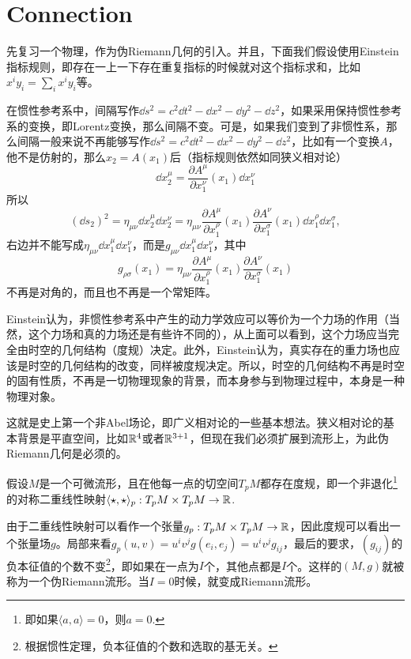 \chapter{Connection}
\newcommand{\gl}{\mathfrak{gl}}

先复习一个物理，作为伪Riemann几何的引入。并且，下面我们假设使用Einstein指标规则，即存在一上一下存在重复指标的时候就对这个指标求和，比如$x^iy_i=\sum_{i}x^iy_i$等。

在惯性参考系中，间隔写作$\dd s^2=c^2 \dd t^2-\dd x^2-\dd y^2-\dd z^2$，如果采用保持惯性参考系的变换，即Lorentz变换，那么间隔不变。可是，如果我们变到了非惯性系，那么间隔一般来说不再能够写作$\dd s^2=c^2 \dd t^2-\dd x^2-\dd y^2-\dd z^2$，比如有一个变换$A$，他不是仿射的，那么$x_2=A(x_1)$后（指标规则依然如同狭义相对论）
\[
	\dd x_2^\mu=\frac{\partial A^\mu}{\partial x_1^\nu}(x_1)\dd x_1^\nu
\]
所以
\[
	(\dd s_2)^2=\eta_{\mu\nu}\dd x_2^\mu\dd x_2^\nu=\eta_{\mu\nu}\frac{\partial A^\mu}{\partial x_1^\rho}(x_1)\frac{\partial A^\nu}{\partial x_1^\sigma}(x_1)\dd x_1^\rho\dd x_1^\sigma,
\]
右边并不能写成$\eta_{\mu\nu}\dd x_1^\mu\dd x_1^\nu$，而是$g_{\mu\nu}\dd x_1^\mu\dd x_1^\nu$，其中
\[
	g_{\rho\sigma}(x_1)=\eta_{\mu\nu}\frac{\partial A^\mu}{\partial x_1^\rho}(x_1)\frac{\partial A^\nu}{\partial x_1^\sigma}(x_1)
\]
不再是对角的，而且也不再是一个常矩阵。

Einstein认为，非惯性参考系中产生的动力学效应可以等价为一个力场的作用（当然，这个力场和真的力场还是有些许不同的），从上面可以看到，这个力场应当完全由时空的几何结构（度规）决定。此外，Einstein认为，真实存在的重力场也应该是时空的几何结构的改变，同样被度规决定。所以，时空的几何结构不再是时空的固有性质，不再是一切物理现象的背景，而本身参与到物理过程中，本身是一种物理对象。

这就是史上第一个非Abel场论，即广义相对论的一些基本想法。狭义相对论的基本背景是平直空间，比如$\mathbb{R}^4$或者$\mathbb{R}^{3+1}$，但现在我们必须扩展到流形上，为此伪Riemann几何是必须的。

\para 假设$M$是一个可微流形，且在他每一点的切空间$T_pM$都存在度规，即一个非退化\footnote{即如果$\langle a,a\rangle=0$，则$a=0$.}的对称二重线性映射$\langle\star,\star\rangle_p:T_pM\times T_pM\to \mathbb{R}$.

由于二重线性映射可以看作一个张量$g_p:T_pM\times T_pM\to \mathbb{R}$，因此度规可以看出一个张量场$g$。局部来看$g_p(u,v)=u^iv^jg(e_i,e_j)=u^iv^jg_{ij}$，最后的要求，$(g_{ij})$的负本征值的个数不变\footnote{根据惯性定理，负本征值的个数和选取的基无关。}，即如果在一点为$I$个，其他点都是$I$个。这样的$(M,g)$就被称为一个伪Riemann流形。当$I=0$时候，就变成Riemann流形。

